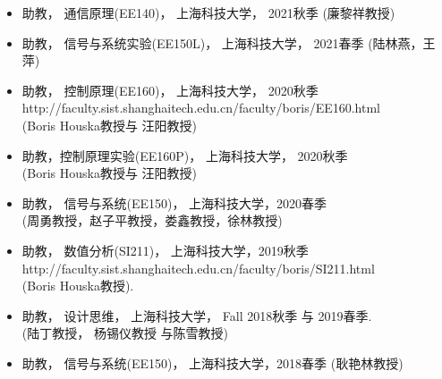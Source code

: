 \documentclass[paper=a4,fontsize=11pt]{scrartcl} %
\newlength{\spacebox}
\newcommand{\NewPart}[1]{\section*{\uppercase{#1}}}
\newcommand{\PersonalEntry}[2]{
		\noindent\hangindent=2em\hangafter=0 %
		\parbox{\spacebox}{        %
		\textit{#1}}		       %
		\hspace{1.5em} #2 \par}    %
\newcommand{\SkillsEntry}[2]{      %
		\noindent\hangindent=2em\hangafter=0 %
		\parbox{\spacebox}{        %
		\textit{#1}}			   %
		\hspace{1.5em} #2 \par}    %
\begin{document}
\begin{CJK*}{UTF8}{gbsn}
\begin{itemize}
	
	\item{助教， 	通信原理(EE140)， 上海科技大学， 2021秋季 (廉黎祥教授)}
	
	\item{助教，  信号与系统实验(EE150L)， 上海科技大学， 2021春季 (陆林燕，王萍)}
	
	\item{助教， 控制原理(EE160)， 上海科技大学， 2020秋季\\ 
		http://faculty.sist.shanghaitech.edu.cn/faculty/boris/EE160.html\\
		(Boris Houska教授与 汪阳教授)
	}
	
	\item{助教，控制原理实验(EE160P)， 上海科技大学， 2020秋季\\ (Boris Houska教授与 汪阳教授)}
	
	\item{助教， 信号与系统(EE150)，  上海科技大学，2020春季 \\ (周勇教授，赵子平教授，娄鑫教授，徐林教授)}
	
	\item{助教， 数值分析(SI211)， 上海科技大学，2019秋季\\ 
		{http://faculty.sist.shanghaitech.edu.cn/faculty/boris/SI211.html}\\
		(Boris Houska教授).
	}
	
	\item{助教， 设计思维， 上海科技大学， Fall 2018秋季 与 2019春季.\\ (陆丁教授， 杨锡仪教授 与陈雪教授) }
	
	\item{助教， 信号与系统(EE150)，  上海科技大学，2018春季 (耿艳林教授)
		}


	
\end{itemize}



\end{CJK*}
\end{document}
